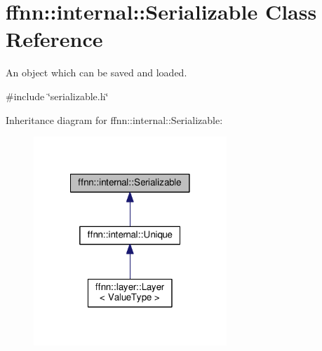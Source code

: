 \hypertarget{classffnn_1_1internal_1_1_serializable}{\section{ffnn\-:\-:internal\-:\-:Serializable Class Reference}
\label{classffnn_1_1internal_1_1_serializable}
}


An object which can be saved and loaded.  




{\ttfamily \#include \char`\"{}serializable.\-h\char`\"{}}



Inheritance diagram for ffnn\-:\-:internal\-:\-:Serializable\-:
\nopagebreak
\begin{figure}[H]
\begin{center}
\leavevmode
\includegraphics[width=206pt]{classffnn_1_1internal_1_1_serializable__inherit__graph}
\end{center}
\end{figure}
